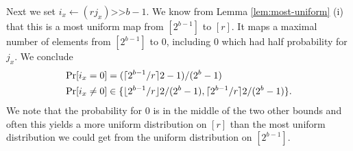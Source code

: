 Next we set $i_x\gets (rj_x)\texttt{>>}b-1$. We know from Lemma
\ref{lem:most-uniform} (i) that this is a most uniform map from
$[2^{b-1}]$ to $[r]$.  It maps a maximal number of elements from
$[2^{b-1}]$ to $0$, including $0$ which had half probability for
$j_x$.
We conclude
\begin{align}
   \Pr[i_x=0] &= (\lceil {2^{b-1}/r}\rceil2-1)/(2^{b}-1)
   \label{eq:prix0}
   \\
   \Pr[i_x\neq 0] &\in
   \{\lfloor {2^{b-1}/r} \rfloor2/(2^{b}-1), \lceil {2^{b-1}/r}\rceil2/(2^{b}-1)\}
   \label{eq:prixneq0}
   .
\end{align}
We note
that the probability for $0$ is in the middle of the two other
bounds and often this yields a more uniform distribution on $[r]$ than
the most uniform distribution we could get from the
uniform distribution on $[2^{b-1}]$.

